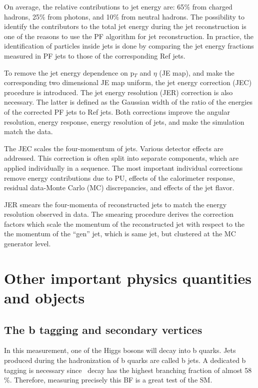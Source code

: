 On average, the relative contributions to jet energy are: 65$\%$ from charged hadrons, 25$\%$ from photons, and 10$\%$ from neutral hadrons. The possibility to identify the contributors to the total jet energy during the jet reconstruction is one of the reasons to use the PF algorithm for jet reconstruction. In practice, the identification of particles inside jets is done by comparing the jet energy fractions measured in PF jets to those of the corresponding Ref jets.

To remove the jet energy dependence on p$_T$ and $\eta$ (JE map), and make the corresponding two dimensional JE map uniform, the jet energy correction (JEC) procedure is introduced. The jet energy resolution (JER) correction is also necessary. The latter is defined as the Gaussian width of the ratio of the energies of the corrected PF jets to Ref jets. Both corrections improve the angular resolution, energy response, energy resolution of jets, and make the simulation match the data. 

The JEC scales the four-momentum of jets. Various detector effects are addressed. This correction is often split into separate components, which are applied individually in a sequence. The most important individual corrections remove energy contributions due to PU, effects of the calorimeter response, residual data-Monte Carlo (MC) discrepancies, and effects of the jet flavor.

JER smears the four-momenta of reconstructed jets to match the energy resolution observed in data. The smearing procedure derives the correction factors which scale the momentum of the reconstructed jet with respect to the the momentum of the ``gen'' jet, which is same jet, but clustered at the MC generator level.

\section{Other important physics quantities and objects}
\subsection{The b tagging and secondary vertices}\label{sec:btag}

In this measurement, one of the Higgs bosons will decay into b quarks. Jets produced during the hadronization of b quarks are called b jets. A dedicated b tagging is necessary since \HBB~decay has the highest branching fraction of almost 58$\%$. Therefore, measuring precisely this BF is a great test of the SM.

